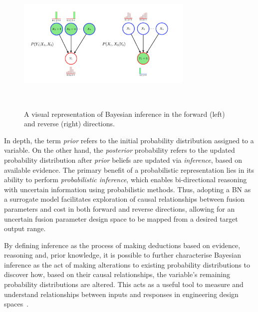 \documentclass[journal]{IEEEtran}
\begin{document}
\begin{figure}[t]
    \centering
    \includegraphics[width=0.75\textwidth]{figures/methodology/inference_F&R_diagram.png}
    \caption{A visual representation of Bayesian inference in the forward (left) and reverse (right) directions.}~\label{fig:inference_F&R_diagram}
\end{figure}

In depth, the term \textit{prior} refers to the initial probability distribution assigned to a variable. On the other hand, the \textit{posterior} probability refers to the updated probability distribution after \textit{prior} beliefs are updated via \textit{inference}, based on available evidence. The primary benefit of a probabilistic representation lies in its ability to perform \textit{probabilistic inference}, which enables bi-directional reasoning with uncertain information using probabilistic methods. Thus, adopting a BN as a surrogate model facilitates exploration of causal relationships between fusion parameters and cost in both forward and reverse directions, allowing for an uncertain fusion parameter design space to be mapped from a desired target output range. 

By defining inference as the process of making deductions based on evidence, reasoning and, prior knowledge, it is possible to further characterise Bayesian inference as the act of making alterations to existing probability distributions to discover how, based on their causal relationships, the variable's remaining probability distributions are altered. This acts as a useful tool to measure and understand relationships between inputs and responses in engineering design spaces~\cite{Koller2009}. 
\end{document}
